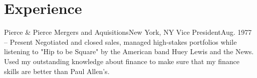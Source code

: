 \section{Experience}
    \resumeSubHeadingListStart
        \resumeSubheading
            {Pierce \& Pierce Mergers and Aquisitions}{New York, NY}
            {Vice President}{Aug. 1977 -- Present}
        \resumeItemListStart
                {Negotiated and closed sales, managed high-stakes portfolios while listening to "Hip to be Square" by the American band Huey Lewis and the News.}
                {Used my outstanding knowledge about finance to make sure that my finance skills are better than Paul Allen's.}
        \resumeItemListEnd
    \resumeSubHeadingListEnd